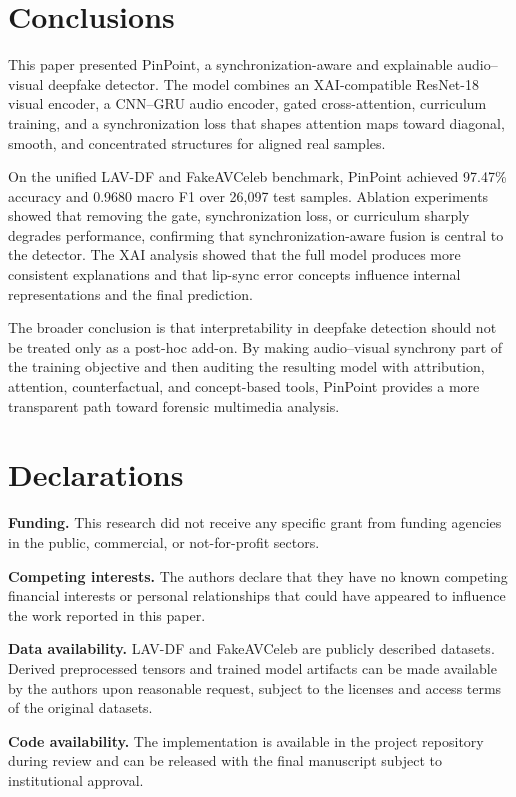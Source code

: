 \documentclass[preprint,12pt,number]{elsarticle}
\begin{document}
\section{Conclusions}
\label{sec:conclusion}

This paper presented PinPoint, a synchronization-aware and explainable audio--visual deepfake detector. The model combines an XAI-compatible ResNet-18 visual encoder, a CNN--GRU audio encoder, gated cross-attention, curriculum training, and a synchronization loss that shapes attention maps toward diagonal, smooth, and concentrated structures for aligned real samples.

On the unified LAV-DF and FakeAVCeleb benchmark, PinPoint achieved 97.47\% accuracy and 0.9680 macro F1 over 26,097 test samples. Ablation experiments showed that removing the gate, synchronization loss, or curriculum sharply degrades performance, confirming that synchronization-aware fusion is central to the detector. The XAI analysis showed that the full model produces more consistent explanations and that lip-sync error concepts influence internal representations and the final prediction.

The broader conclusion is that interpretability in deepfake detection should not be treated only as a post-hoc add-on. By making audio--visual synchrony part of the training objective and then auditing the resulting model with attribution, attention, counterfactual, and concept-based tools, PinPoint provides a more transparent path toward forensic multimedia analysis.

\section*{Declarations}

\textbf{Funding.} This research did not receive any specific grant from funding agencies in the public, commercial, or not-for-profit sectors.

\textbf{Competing interests.} The authors declare that they have no known competing financial interests or personal relationships that could have appeared to influence the work reported in this paper.

\textbf{Data availability.} LAV-DF and FakeAVCeleb are publicly described datasets. Derived preprocessed tensors and trained model artifacts can be made available by the authors upon reasonable request, subject to the licenses and access terms of the original datasets.

\textbf{Code availability.} The implementation is available in the project repository during review and can be released with the final manuscript subject to institutional approval.
\end{document}
